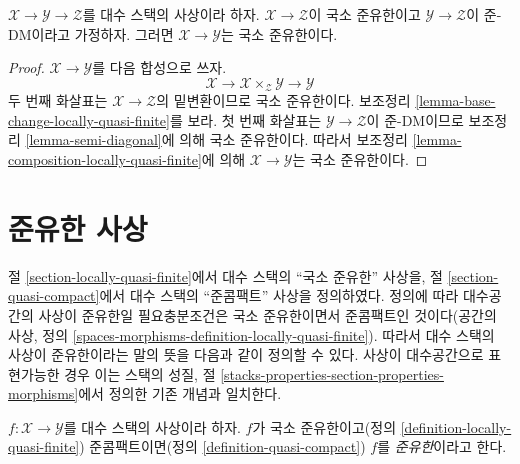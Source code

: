 \begin{lemma}
\label{lemma-locally-quasi-finite-permanence}
$\mathcal{X} \to \mathcal{Y} \to \mathcal{Z}$를 대수 스택의 사상이라
하자. $\mathcal{X} \to \mathcal{Z}$이 국소 준유한이고
$\mathcal{Y} \to \mathcal{Z}$이 준-DM이라고 가정하자. 그러면
$\mathcal{X} \to \mathcal{Y}$는 국소 준유한이다.
\end{lemma}

\begin{proof}
$\mathcal{X} \to \mathcal{Y}$를 다음 합성으로 쓰자.
$$
\mathcal{X} \longrightarrow
\mathcal{X} \times_\mathcal{Z} \mathcal{Y} \longrightarrow
\mathcal{Y}
$$
두 번째 화살표는 $\mathcal{X} \to \mathcal{Z}$의 밑변환이므로 국소
준유한이다. 보조정리 \ref{lemma-base-change-locally-quasi-finite}를 보라.
첫 번째 화살표는 $\mathcal{Y} \to \mathcal{Z}$이 준-DM이므로
보조정리 \ref{lemma-semi-diagonal}에 의해 국소 준유한이다. 따라서
보조정리 \ref{lemma-composition-locally-quasi-finite}에 의해
$\mathcal{X} \to \mathcal{Y}$는 국소 준유한이다.
\end{proof}

















\section{준유한 사상}
\label{section-quasi-finite}

\noindent
절 \ref{section-locally-quasi-finite}에서 대수 스택의 ``국소 준유한''
사상을, 절 \ref{section-quasi-compact}에서 대수 스택의 ``준콤팩트''
사상을 정의하였다. 정의에 따라 대수공간의 사상이 준유한일
필요충분조건은 국소 준유한이면서 준콤팩트인 것이다(공간의 사상,
정의 \ref{spaces-morphisms-definition-locally-quasi-finite}). 따라서 대수
스택의 사상이 준유한이라는 말의 뜻을 다음과 같이 정의할 수 있다.
사상이 대수공간으로 표현가능한 경우 이는 스택의 성질, 절
\ref{stacks-properties-section-properties-morphisms}에서 정의한 기존
개념과 일치한다.

\begin{definition}
\label{definition-quasi-finite}
\begin{reference}
\cite{rydh_approx}
\end{reference}
$f : \mathcal{X} \to \mathcal{Y}$를 대수 스택의 사상이라 하자.
$f$가 국소 준유한이고(정의 \ref{definition-locally-quasi-finite})
준콤팩트이면(정의 \ref{definition-quasi-compact}) $f$를
{\it 준유한}이라고 한다.
\end{definition}

